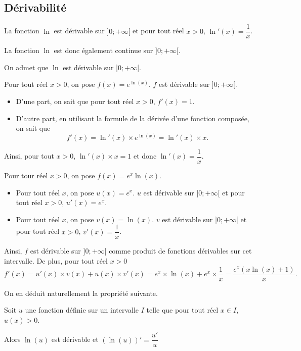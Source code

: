 \documentclass[11pt,fleqn, openany]{book} %
\begin{document}
\newpage

\subsection{Dérivabilité}


\begin{proposition}La fonction $\ln$ est dérivable sur $]0;+\infty[$ et pour tout réel $x>0$, $\ln'(x)=\dfrac{1}{x}$.\end{proposition}

La fonction $\ln$ est donc également continue sur $]0;+\infty[$.

\begin{demonstration}[Au programme]On admet que $\ln$ est dérivable sur $]0;+\infty[$.

Pour tout réel $x>0$, on pose $f(x)=e^{\ln(x)}$. $f$ est dérivable sur $]0;+\infty[$.
\begin{itemize}
\item D'une part, on sait que pour tout réel $x>0$, $f'(x)=1$.
\item D'autre part, en utilisant la formule de la dérivée d'une fonction composée, on sait que 
\[f'(x)=\ln'(x) \times e^{\ln(x)}=\ln'(x) \times x.\]
\end{itemize}
Ainsi, pour tout $x>0$, $\ln'(x) \times x=1$ et donc $\ln'(x)=\dfrac{1}{x}$.\end{demonstration}

\begin{example}Pour tour réel $x>0$, on pose $f(x)=e^x \ln(x)$.

\begin{itemize}
\item Pour tout réel $x$, on pose $u(x)=e^{x}$. $u$ est dérivable sur $]0;+\infty[$ et pour tout réel $x>0$, $u'(x)=e^x$.
\item Pour tout réel $x$, on pose $v(x)=\ln (x)$. $v$ est dérivable sur $]0;+\infty[$ et pour tout réel $x>0$, $v'(x)=\dfrac{1}{x}$.
\end{itemize}
Ainsi, $f$ est dérivable sur $]0;+\infty[$ comme produit de fonctions dérivables sur cet intervalle. De plus, pour tout réel $x>0$
\[ f'(x)=u'(x) \times v(x) + u(x) \times v'(x)=e^x \times \ln(x) + e^x \times \dfrac{1}{x}= \dfrac{e^x(x\ln(x)+1)}{x}.\]\end{example}

On en déduit naturellement la propriété suivante.

\begin{proposition}Soit $u$ une fonction définie sur un intervalle $I$ telle que pour tout réel $x\in I$, $u(x)>0$. 

Alors $\ln(u)$ est dérivable et $(\ln(u))'=\dfrac{u'}{u}$\end{proposition}
\end{document}
